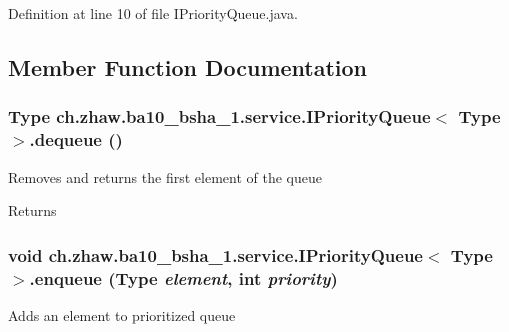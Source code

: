 Definition at line 10 of file IPriorityQueue.java.

\subsection{Member Function Documentation}
\hypertarget{interfacech_1_1zhaw_1_1ba10__bsha__1_1_1service_1_1IPriorityQueue_3_01Type_01_4_ab7f77589afa931b05e90eefe9d78c19b}{
\subsubsection[{dequeue}]{\setlength{\rightskip}{0pt plus 5cm}Type ch.zhaw.ba10\_\-bsha\_\-1.service.IPriorityQueue$<$ Type $>$.dequeue ()}}
\label{interfacech_1_1zhaw_1_1ba10__bsha__1_1_1service_1_1IPriorityQueue_3_01Type_01_4_ab7f77589afa931b05e90eefe9d78c19b}
Removes and returns the first element of the queue

\begin{DoxyReturn}{Returns}

\end{DoxyReturn}
\hypertarget{interfacech_1_1zhaw_1_1ba10__bsha__1_1_1service_1_1IPriorityQueue_3_01Type_01_4_aa9cdd52f39b33c253ec7bad245bd5023}{
\subsubsection[{enqueue}]{\setlength{\rightskip}{0pt plus 5cm}void ch.zhaw.ba10\_\-bsha\_\-1.service.IPriorityQueue$<$ Type $>$.enqueue (Type {\em element}, \/  int {\em priority})}}
\label{interfacech_1_1zhaw_1_1ba10__bsha__1_1_1service_1_1IPriorityQueue_3_01Type_01_4_aa9cdd52f39b33c253ec7bad245bd5023}
Adds an element to prioritized queue


